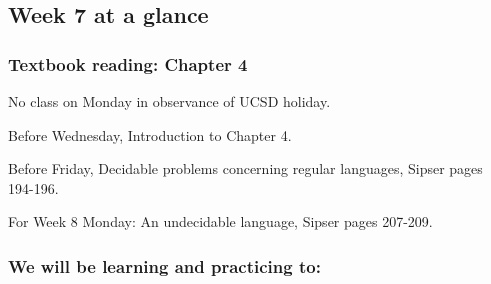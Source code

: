 

\subsection*{Week 7 at a glance}

\subsubsection*{Textbook reading: Chapter 4}

\vspace{-20pt}
No class on Monday in observance of UCSD holiday.

Before Wednesday, Introduction to Chapter 4.

Before Friday, Decidable problems concerning regular languages, 
Sipser pages 194-196.

For Week 8 Monday: An undecidable language, Sipser pages 207-209.

\vspace{-20pt}

\subsubsection*{We will be learning and practicing to:}

\vspace{-20pt}

